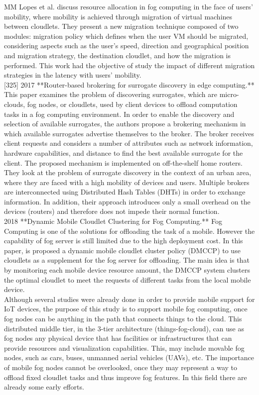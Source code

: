 MM Lopes et al. \cite{Lopes2017} discuss resource allocation in fog computing in the face of users’ mobility, where mobility is achieved through migration of virtual machines between cloudlets. They present a new migration technique composed of two modules: migration policy which defines when the user VM should be migrated, considering aspects such as the user's speed, direction and geographical position and migration strategy, the destination cloudlet, and how the migration is performed. This work had the objective of study the impact of different migration strategies in the latency with users’ mobility.\\

[325] 2017 **Router-based brokering for surrogate discovery in edge computing.**
This paper examines the problem of discovering surrogates, which are micro-clouds, fog nodes, or cloudlets, used by client devices to offload computation tasks in a fog computing environment. In order to enable the discovery and selection of available surrogates, the authors propose a brokering mechanism in which available surrogates advertise themselves to the broker. The broker receives client requests and considers a number of attributes such as network information, hardware capabilities, and distance to find the best available surrogate for the client. The proposed mechanism is implemented on off-the-shelf home routers. They look at the problem of surrogate discovery in the context of an urban area, where they are faced with a high mobility of devices and users. Multiple brokers are interconnected using Distributed Hash Tables (DHTs) in order to exchange information. In addition, their approach introduces only a small overhead on the devices (routers) and therefore does not impede their normal function.\\

2018 **Dynamic Mobile Cloudlet Clustering for Fog Computing.**
Fog Computing is one of the solutions for offloading the task of a mobile. However the capability of fog server is still limited due to the high deployment cost. In this paper, is proposed a dynamic mobile cloudlet cluster policy (DMCCP) to use cloudlets as a supplement for the fog server for offloading. The main idea is that by monitoring each mobile device resource amount, the DMCCP system clusters the optimal cloudlet to meet the requests of different tasks from the local mobile device.\\

\noindent\tab Although several studies were already done in order to provide mobile support for IoT devices, the purpose of this study is to support mobile fog computing, once fog nodes can be anything in the path that connects things to the cloud. This distributed middle tier, in the 3-tier architecture (things-fog-cloud), can use as fog nodes any physical device that has facilities or infrastructures that can provide resources and visualization capabilities. This, may include movable fog nodes, such as cars, buses, unmanned aerial vehicles (UAVs), etc. The importance of mobile fog nodes cannot be overlooked, once they may represent a way to offload fixed cloudlet tasks and thus improve fog features. In this field there are already some early efforts.\\

